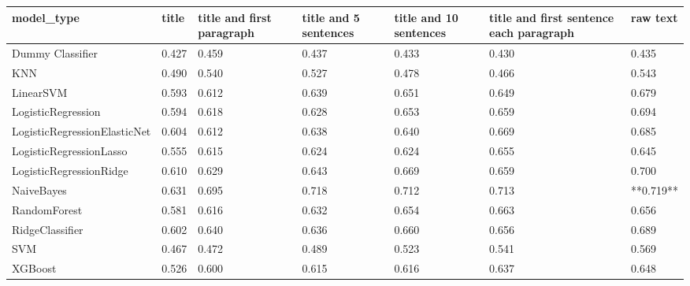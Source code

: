 \begin{tabular}{lllllll}
\toprule
                  model\_type & title & title and first paragraph & title and 5 sentences & title and 10 sentences & title and first sentence each paragraph &  raw text \\
\midrule
            Dummy Classifier & 0.427 &                     0.459 &                 0.437 &                  0.433 &                                   0.430 &     0.435 \\
                         KNN & 0.490 &                     0.540 &                 0.527 &                  0.478 &                                   0.466 &     0.543 \\
                   LinearSVM & 0.593 &                     0.612 &                 0.639 &                  0.651 &                                   0.649 &     0.679 \\
          LogisticRegression & 0.594 &                     0.618 &                 0.628 &                  0.653 &                                   0.659 &     0.694 \\
LogisticRegressionElasticNet & 0.604 &                     0.612 &                 0.638 &                  0.640 &                                   0.669 &     0.685 \\
     LogisticRegressionLasso & 0.555 &                     0.615 &                 0.624 &                  0.624 &                                   0.655 &     0.645 \\
     LogisticRegressionRidge & 0.610 &                     0.629 &                 0.643 &                  0.669 &                                   0.659 &     0.700 \\
                  NaiveBayes & 0.631 &                     0.695 &                 0.718 &                  0.712 &                                   0.713 & **0.719** \\
                RandomForest & 0.581 &                     0.616 &                 0.632 &                  0.654 &                                   0.663 &     0.656 \\
             RidgeClassifier & 0.602 &                     0.640 &                 0.636 &                  0.660 &                                   0.656 &     0.689 \\
                         SVM & 0.467 &                     0.472 &                 0.489 &                  0.523 &                                   0.541 &     0.569 \\
                     XGBoost & 0.526 &                     0.600 &                 0.615 &                  0.616 &                                   0.637 &     0.648 \\
\bottomrule
\end{tabular}
